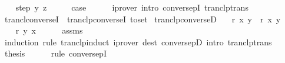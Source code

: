 \begin{isabellebody}
\isamarkupfalse%
\isanewline
\ \ \isamarkupfalse%
\ {\isacharparenleft}{\kern0pt}step\ y\ z{\isacharparenright}{\kern0pt}\isanewline
\ \ \isamarkupfalse%
\ \isamarkupfalse%
\ {\isacharquery}{\kern0pt}case\isanewline
\ \ \ \ \isamarkupfalse%
\ {\isacharparenleft}{\kern0pt}iprover\ intro{\isacharcolon}{\kern0pt}\ conversepI\ tranclp{\isacharunderscore}{\kern0pt}trans{\isacharparenright}{\kern0pt}\isanewline
{}\isamarkupfalse%
%
\endisatagproof
{\isafoldproof}%
%
\isadelimproof
\isanewline
%
\endisadelimproof
\isanewline
{}\isamarkupfalse%
\ trancl{\isacharunderscore}{\kern0pt}converseI\ {\isacharequal}{\kern0pt}\ tranclp{\isacharunderscore}{\kern0pt}converseI\ {\isacharbrackleft}{\kern0pt}to{\isacharunderscore}{\kern0pt}set{\isacharbrackright}{\kern0pt}\isanewline
\isanewline
{}\isamarkupfalse%
\ tranclp{\isacharunderscore}{\kern0pt}converseD{\isacharcolon}{\kern0pt}\isanewline
\ \ \ {\isachardoublequoteopen}{\isacharparenleft}{\kern0pt}r{\isasyminverse}{\isasyminverse}{\isacharparenright}{\kern0pt}\isactrlsup {\isacharplus}{\kern0pt}\isactrlsup {\isacharplus}{\kern0pt}\ x\ y{\isachardoublequoteclose}\ \ {\isachardoublequoteopen}{\isacharparenleft}{\kern0pt}r\isactrlsup {\isacharplus}{\kern0pt}\isactrlsup {\isacharplus}{\kern0pt}{\isacharparenright}{\kern0pt}{\isasyminverse}{\isasyminverse}\ x\ y{\isachardoublequoteclose}\isanewline
%
\isadelimproof
%
\endisadelimproof
%
\isatagproof
{}\isamarkupfalse%
\ {\isacharminus}{\kern0pt}\isanewline
\ \ \isamarkupfalse%
\ {\isachardoublequoteopen}r\isactrlsup {\isacharplus}{\kern0pt}\isactrlsup {\isacharplus}{\kern0pt}\ y\ x{\isachardoublequoteclose}\isanewline
\ \ \ \ \isamarkupfalse%
\ assms\isanewline
\ \ \ \ \isamarkupfalse%
\ {\isacharparenleft}{\kern0pt}induction\ rule{\isacharcolon}{\kern0pt}\ tranclp{\isacharunderscore}{\kern0pt}induct{\isacharparenright}{\kern0pt}\ {\isacharparenleft}{\kern0pt}iprover\ dest{\isacharcolon}{\kern0pt}\ conversepD\ intro{\isacharcolon}{\kern0pt}\ tranclp{\isacharunderscore}{\kern0pt}trans{\isacharparenright}{\kern0pt}{\isacharplus}{\kern0pt}\isanewline
\ \ \isamarkupfalse%
\ \isamarkupfalse%
\ {\isacharquery}{\kern0pt}thesis\isanewline
\ \ \ \ \isamarkupfalse%
\ {\isacharparenleft}{\kern0pt}rule\ conversepI{\isacharparenright}{\kern0pt}\isanewline
{}\isamarkupfalse%
%
\endisatagproof
{\isafoldproof}%

\end{isabellebody}
